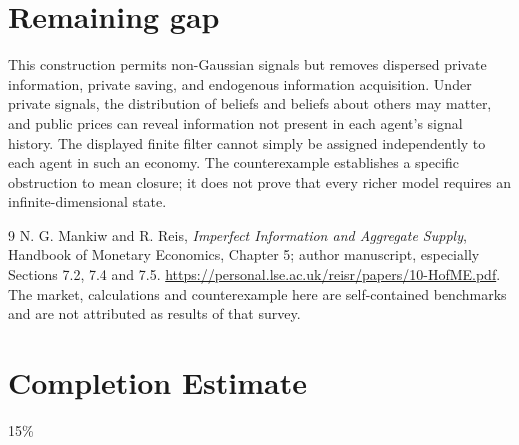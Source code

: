 \documentclass[11pt]{article}
\theoremstyle{definition}
\theoremstyle{remark}
\begin{document}
\section{Remaining gap}
This construction permits non-Gaussian signals but removes dispersed private information, private saving, and endogenous information acquisition. Under private signals, the distribution of beliefs and beliefs about others may matter, and public prices can reveal information not present in each agent's signal history. The displayed finite filter cannot simply be assigned independently to each agent in such an economy. The counterexample establishes a specific obstruction to mean closure; it does not prove that every richer model requires an infinite-dimensional state.

\begin{thebibliography}{9}
 N. G. Mankiw and R. Reis, \emph{Imperfect Information and Aggregate Supply}, Handbook of Monetary Economics, Chapter 5; author manuscript, especially Sections 7.2, 7.4 and 7.5. \url{https://personal.lse.ac.uk/reisr/papers/10-HofME.pdf}. The market, calculations and counterexample here are self-contained benchmarks and are not attributed as results of that survey.
\end{thebibliography}
\section{Completion Estimate}
15\%
\end{document}

